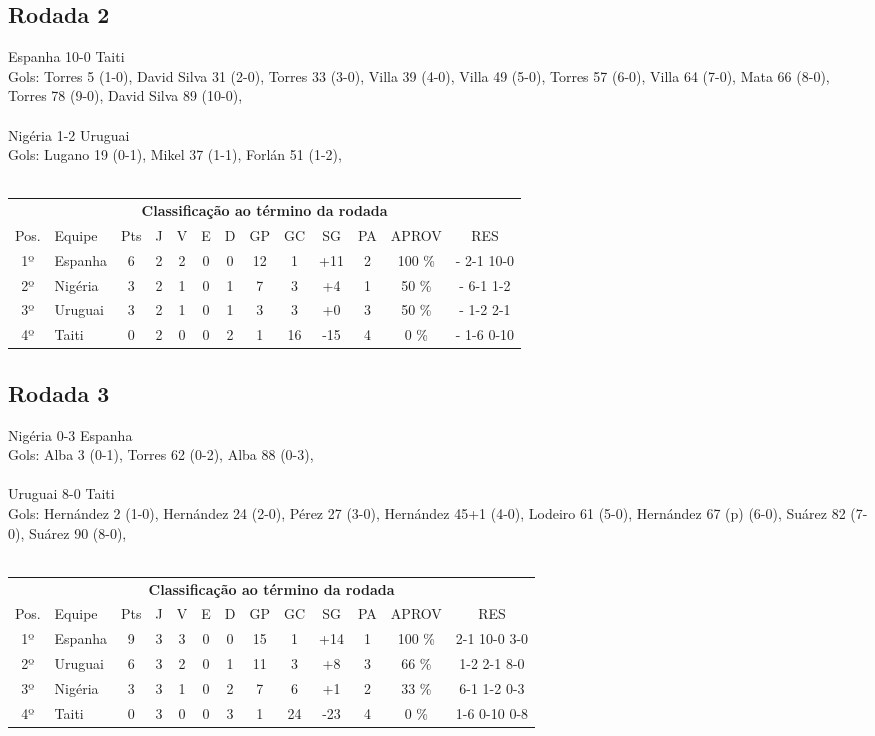 \documentclass{article}
\begin{document}
\subsection*{Rodada 2}
Espanha 10-0 Taiti\\
Gols: Torres  5 (1-0), David Silva  31 (2-0), Torres  33 (3-0), Villa  39 (4-0), Villa  49 (5-0), Torres  57 (6-0), Villa  64 (7-0), Mata  66 (8-0), Torres  78 (9-0), David Silva  89 (10-0), \\
\\
Nigéria 1-2 Uruguai\\
Gols: Lugano  19 (0-1), Mikel  37 (1-1), Forlán  51 (1-2), \\
\\
\begin{center}
\begin{tabular}{| c | l | c | c | c | c | c | c | c | c | c | c | c |}
\multicolumn{13}{c}{\textbf{Classificação ao término da rodada}}\\
Pos.&Equipe&Pts&J&V&E&D&GP&GC&SG&PA&APROV&RES\\
1º&Espanha             &6&2	&2&0&0	&12&1&+11	&2&100 \%	& - 2-1 10-0 \\
2º&Nigéria             &3&2	&1&0&1	&7&3&+4	&1& 50 \%	& - 6-1 1-2 \\
3º&Uruguai             &3&2	&1&0&1	&3&3&+0	&3& 50 \%	& - 1-2 2-1 \\
4º&Taiti               &0&2	&0&0&2	&1&16&-15	&4&  0 \%	& - 1-6 0-10 \\
\end{tabular}
\end{center}


\subsection*{Rodada 3}
Nigéria 0-3 Espanha\\
Gols: Alba  3 (0-1), Torres  62 (0-2), Alba  88 (0-3), \\
\\
Uruguai 8-0 Taiti\\
Gols: Hernández  2 (1-0), Hernández  24 (2-0), Pérez  27 (3-0), Hernández  45+1 (4-0), Lodeiro  61 (5-0), Hernández  67 (p) (6-0), Suárez  82 (7-0), Suárez  90 (8-0), \\
\\
\begin{center}
\begin{tabular}{| c | l | c | c | c | c | c | c | c | c | c | c | c |}
\multicolumn{13}{c}{\textbf{Classificação ao término da rodada}}\\
Pos.&Equipe&Pts&J&V&E&D&GP&GC&SG&PA&APROV&RES\\
1º&Espanha             &9&3	&3&0&0	&15&1&+14	&1&100 \%	&2-1 10-0 3-0 \\
2º&Uruguai             &6&3	&2&0&1	&11&3&+8	&3& 66 \%	&1-2 2-1 8-0 \\
3º&Nigéria             &3&3	&1&0&2	&7&6&+1	&2& 33 \%	&6-1 1-2 0-3 \\
4º&Taiti               &0&3	&0&0&3	&1&24&-23	&4&  0 \%	&1-6 0-10 0-8 \\
\end{tabular}
\end{center}
\end{document}

